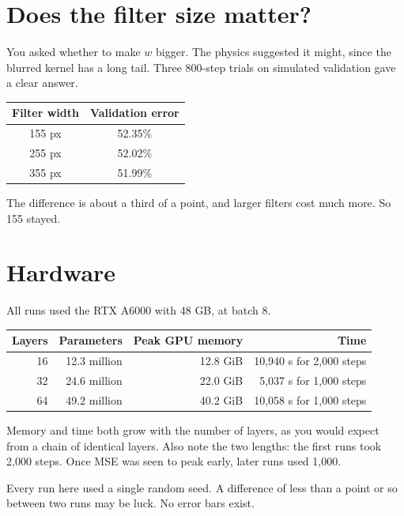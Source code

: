 \section{Does the filter size matter?}

You asked whether to make $w$ bigger. The physics suggested it might, since the blurred kernel has a long
tail. Three 800-step trials on simulated validation gave a clear answer.

\begin{center}
\begin{tabular}{cc}
\toprule
Filter width & Validation error \\
\midrule
155 px & 52.35\% \\
255 px & 52.02\% \\
355 px & 51.99\% \\
\bottomrule
\end{tabular}
\end{center}

The difference is about a third of a point, and larger filters cost much more. So 155 stayed.

\section{Hardware}

All runs used the RTX A6000 with 48 GB, at batch 8.

\begin{center}
\begin{tabular}{rrrr}
\toprule
Layers & Parameters & Peak GPU memory & Time \\
\midrule
16 & 12.3 million & 12.8 GiB & 10,940 s for 2,000 steps \\
32 & 24.6 million & 22.0 GiB & 5,037 s for 1,000 steps \\
64 & 49.2 million & 40.2 GiB & 10,058 s for 1,000 steps \\
\bottomrule
\end{tabular}
\end{center}

Memory and time both grow with the number of layers, as you would expect from a chain of identical
layers. Also note the two lengths: the first runs took 2,000 steps. Once MSE was seen to peak early, later
runs used 1,000.

\begin{careful}
Every run here used a single random seed. A difference of less than a point or so between two runs may
be luck. No error bars exist.
\end{careful}
